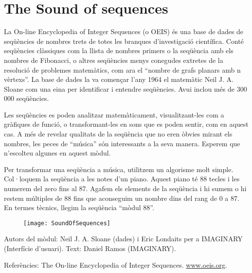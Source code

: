 \section{The Sound of sequences}
La  On-line Encyclopedia of Integer Sequences (o OEIS) és una base de dades de seqüències de nombres trets de totes les branques d'investigació científica. Conté seqüències clàssiques com la llista de nombres primers o la seqüència amb els nombres de Fibonacci, o altres seqüències menys conegudes extretes de la resolució de problemes matemàtics, com ara el ``nombre de grafs planars amb n vèrtexs''. La base de dades la va començar l'any 1964 el matemàtic Neil J. A. Sloane com una eina per identificar i entendre seqüències. Avui inclou més de 300 000 seqüències.  

Les seqüències es poden analitzar matemàticament, visualitzant-les com a gràfiques de funció, o transformant-les en sons que es poden sentir, com en aquest cas. A més de revelar qualitats de la seqüència que no eren òbvies mirant els nombres, les peces de ``música'' són interessants a la seva manera. Esperem que n'escolteu algunes en aquest mòdul.  

Per transformar una seqüència a música, utilitzem un algorisme molt simple. Col·loquem la seqüència a les notes d'un piano. Aquest piano té 88 tecles i les numerem del zero fins al 87. Agafem els elements de la seqüència i hi sumem o hi restem múltiples de 88 fins que aconseguim un nombre dins del rang de 0 a 87. En termes tècnics, llegim la seqüència ``mòdul 88''.

\begin{figure}[h]
\centering
\texttt{[image: SoundOfSequences]}
\end{figure}

\vfill

Autors del mòdul: Neil J. A. Sloane (dades) i Eric Londaits per a IMAGINARY (Interfície d'usuari).
Text: Daniel Ramos (IMAGINARY).

Referències:
The On-line Encyclopedia of Integer Sequences. \url{www.oeis.org}.


